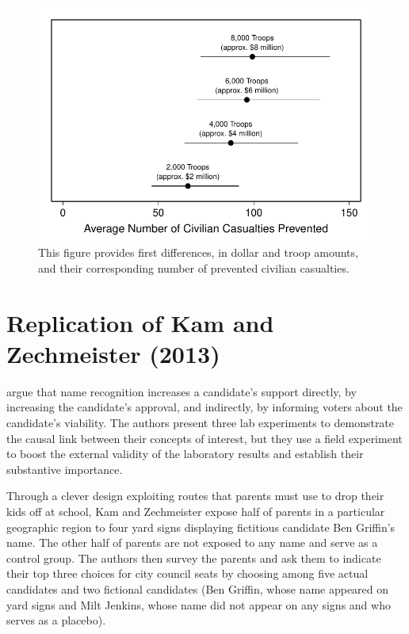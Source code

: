 \documentclass[12pt]{article}
\begin{document}
\begin{figure}[H]
\begin{center}
\includegraphics[scale = .8]{figs/hks-ci.pdf}
\caption{This figure provides first differences, in dollar and troop amounts, and their corresponding number of prevented civilian casualties.}\label{fig:hks-ci}
\end{center}
\end{figure}

\section*{Replication of Kam and Zechmeister (2013)}

\cite{KamZechmeister2013} argue that name recognition increases a candidate's support directly, by increasing the candidate's approval, and indirectly, by informing voters about the candidate's viability. The authors present three lab experiments to demonstrate the causal link between their concepts of interest, but they use a field experiment to boost the external validity of the laboratory results and establish their substantive importance. 

Through a clever design exploiting routes that parents must use to drop their kids off at school, Kam and Zechmeister expose half of parents in a particular geographic region to four yard signs displaying fictitious candidate Ben Griffin's name. The other half of parents are not exposed to any name and serve as a control group. The authors then survey the parents and ask them to indicate their top three choices for city council seats by choosing among five actual candidates and two fictional candidates (Ben Griffin, whose name appeared on yard signs and Milt Jenkins, whose name did not appear on any signs and who serves as a placebo). 
\end{document}
